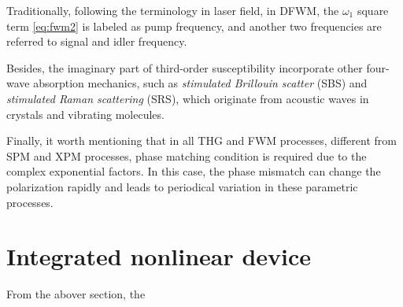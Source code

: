 \begin{itemize}
Traditionally, following the terminology in laser field, in DFWM, the $\omega_1$ square term \autoref{eq:fwm2} is labeled as pump frequency, and another two frequencies are referred to signal and idler frequency.
\end{itemize}

Besides, the imaginary part of third-order susceptibility incorporate other four-wave absorption mechanics, such as \textit{stimulated Brillouin scatter} (SBS) and \textit{stimulated Raman scattering} (SRS), which originate from acoustic waves in crystals and vibrating molecules.

Finally, it worth mentioning that in all THG and FWM processes, different from SPM and XPM processes, phase matching condition is required due to the complex exponential factors. In this case, the phase mismatch can change the polarization rapidly and leads to periodical variation in these parametric processes.



\section{Integrated nonlinear device}

From the abover section, the 